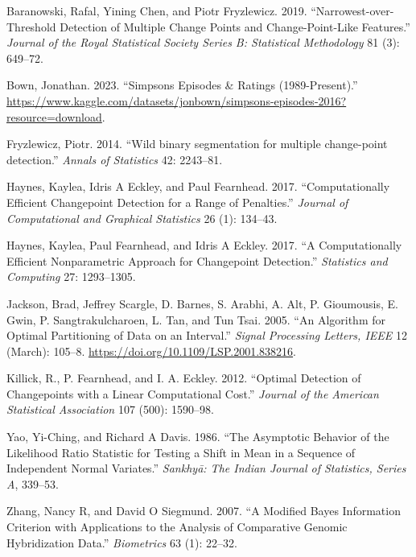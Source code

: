 \documentclass[
  letterpaper,
  DIV=11,
  numbers=noendperiod]{scrreprt}
\newlength{\cslhangindent}
\newenvironment{CSLReferences}[2] %
 {\begin{list}{}{%
  \setlength{\itemindent}{0pt}
  \setlength{\leftmargin}{0pt}
  \setlength{\parsep}{0pt}
  \ifodd #1
   \setlength{\leftmargin}{\cslhangindent}
   \setlength{\itemindent}{-1\cslhangindent}
  \fi
  \setlength{\itemsep}{#2\baselineskip}}}
 {\end{list}}
\begin{document}
\label{refs}
\begin{CSLReferences}{1}{0}
Baranowski, Rafal, Yining Chen, and Piotr Fryzlewicz. 2019.
{``Narrowest-over-Threshold Detection of Multiple Change Points and
Change-Point-Like Features.''} \emph{Journal of the Royal Statistical
Society Series B: Statistical Methodology} 81 (3): 649--72.

Bown, Jonathan. 2023. {``Simpsons Episodes \& Ratings (1989-Present).''}
\url{https://www.kaggle.com/datasets/jonbown/simpsons-episodes-2016?resource=download}.

Fryzlewicz, Piotr. 2014. {``{Wild binary segmentation for multiple
change-point detection}.''} \emph{Annals of Statistics} 42: 2243--81.

Haynes, Kaylea, Idris A Eckley, and Paul Fearnhead. 2017.
{``Computationally Efficient Changepoint Detection for a Range of
Penalties.''} \emph{Journal of Computational and Graphical Statistics}
26 (1): 134--43.

Haynes, Kaylea, Paul Fearnhead, and Idris A Eckley. 2017. {``A
Computationally Efficient Nonparametric Approach for Changepoint
Detection.''} \emph{Statistics and Computing} 27: 1293--1305.

Jackson, Brad, Jeffrey Scargle, D. Barnes, S. Arabhi, A. Alt, P.
Gioumousis, E. Gwin, P. Sangtrakulcharoen, L. Tan, and Tun Tsai. 2005.
{``An Algorithm for Optimal Partitioning of Data on an Interval.''}
\emph{Signal Processing Letters, IEEE} 12 (March): 105--8.
\url{https://doi.org/10.1109/LSP.2001.838216}.

Killick, R., P. Fearnhead, and I. A. Eckley. 2012. {``Optimal Detection
of Changepoints with a Linear Computational Cost.''} \emph{Journal of
the American Statistical Association} 107 (500): 1590--98.

Yao, Yi-Ching, and Richard A Davis. 1986. {``The Asymptotic Behavior of
the Likelihood Ratio Statistic for Testing a Shift in Mean in a Sequence
of Independent Normal Variates.''} \emph{Sankhy{ā}: The Indian Journal
of Statistics, Series A}, 339--53.

Zhang, Nancy R, and David O Siegmund. 2007. {``A Modified Bayes
Information Criterion with Applications to the Analysis of Comparative
Genomic Hybridization Data.''} \emph{Biometrics} 63 (1): 22--32.

\end{CSLReferences}
\end{document}
